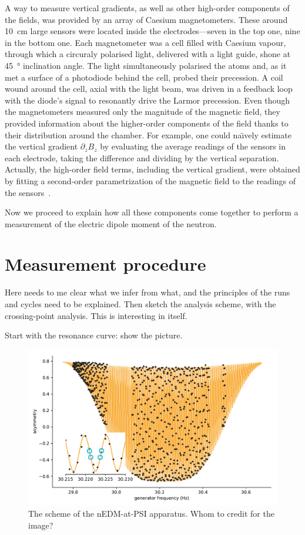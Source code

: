 A way to measure vertical gradients, as well as other high-order components of the fields, was provided by an array of Caesium magnetometers. These around \SI{10}{\centi\meter} large sensors were located inside the electrodes---seven in the top one, nine in the bottom one. Each magnetometer was a cell filled with Caesium vapour, through which a circuraly polarised light, delivered with a light guide, shone at \SI{45}{\degree} inclination angle. The light simultaneously polarised the atoms and, as it met a surface of a photodiode behind the cell, probed their precession. A coil wound around the cell, axial with the light beam, was driven in a feedback loop with the diode's signal to resonantly drive the Larmor precession. Even though the magnetometers measured only the magnitude of the magnetic field, they provided information about the higher-order components of the field thanks to their distribution around the chamber. For example, one could na\"\i vely estimate the vertical gradient $\partial_z B_z$ by evaluating the average readings of the sensors in each electrode, taking the difference and dividing by the vertical separation. Actually, the high-order field terms, including the vertical gradient, were obtained by fitting a second-order parametrization of the magnetic field to the readings of the sensors~\cite{WurstenThesis}.

Now we proceed to explain how all these components come together to perform a measurement of the electric dipole moment of the neutron.



\section{Measurement procedure}
Here needs to me clear what we infer from what, and the principles of the runs and cycles need to be explained. Then sketch the analysis scheme, with the crossing-point analysis. This is interesting in itself.

Start with the resonance curve: show the picture.
\begin{figure}
  \centering
  \includegraphics[width=0.8\linewidth]{gfx/nEDMatPSI/ramsey_scan.pdf}
  \caption{The scheme of the nEDM-at-PSI apparatus. Whom to credit for the image?}
  \label{fig:ramsey_scan}
\end{figure}

